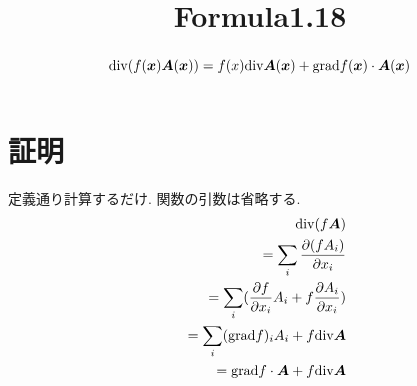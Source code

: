 \documentclass{jsarticle}
\title{Formula1.18}
\newcommand*{\mbold}[1]{\mbox{\boldmath $#1$}}
\newcommand*{\grad}{{\rm grad}}
\newcommand*{\divg}{{\rm div}}
\begin{document}
\maketitle

\begin{abstract}
  \begin{equation}
    \divg(f(\mbold{x})\mbold{A}(\mbold{x})) = 
    f(x)\divg\mbold{A}(\mbold{x}) + \grad f(\mbold{x}) \cdot \mbold{A}(\mbold{x})
  \end{equation}
\end{abstract}

\section*{証明}
定義通り計算するだけ. 関数の引数は省略する. 
\begin{eqnarray}
  && \divg(f\mbold{A}) \nonumber \\
  && = \sum_i \frac{\partial (f A_i)}{\partial x_i} \nonumber \\
  && = \sum_i (\frac{\partial f}{\partial x_i} A_i + f \frac{\partial A_i}{\partial x_i}) \nonumber \\
  && = \sum_i (\grad f)_i A_i + f \divg\mbold{A} \nonumber \\
  && = \grad f \cdot \mbold{A} + f \divg\mbold{A}
\end{eqnarray}
\end{document}
